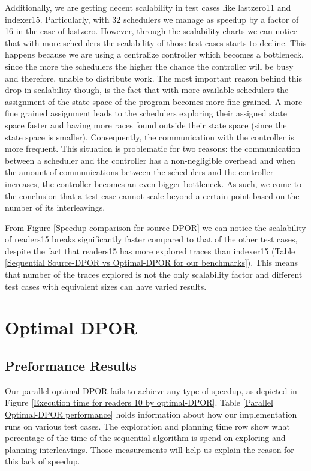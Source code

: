 Additionally, we are getting decent scalability in test cases like lastzero11 and indexer15. Particularly, with
32 schedulers we manage as speedup by a factor of 16 in the case of lastzero. However, through the scalability charts 
we can notice that with more schedulers the scalability of those test cases starts to decline. This happens because we
are using a centralize controller which becomes a bottleneck, since the more the schedulers the
higher the chance the controller will be busy and therefore, unable to distribute work. The most important reason 
behind this drop in scalability though, is the fact that with more available schedulers the assignment of the state
space of the program becomes more fine grained. A more fine grained assignment leads to the schedulers exploring their
assigned state space faster and having more races found outside their state space (since the state space is smaller).
Consequently, the communication with the controller is more frequent. This situation is problematic for two reasons:
the communication between a scheduler and the controller has a non-negligible overhead and when the amount of 
communications between the schedulers and the controller increases, the controller becomes an even bigger bottleneck.
As such, we come to the conclusion that a test case cannot scale beyond a certain point based on the number of its interleavings.

From Figure \ref{Speedup comparison for source-DPOR} we can notice the scalability of readers15 breaks significantly faster
compared to that of the other test cases, despite the fact that readers15 has more explored traces than indexer15
(Table \ref{Sequential Source-DPOR vs Optimal-DPOR for our benchmarks}). This means that number of the traces explored
is not the only scalability factor and different test cases with equivalent sizes can have varied results.

\section{Optimal DPOR}

\subsection{Preformance Results}

Our parallel optimal-DPOR fails to achieve any type of speedup, as depicted in Figure 
\ref{Execution time for readers 10 by optimal-DPOR}. Table \ref{Parallel Optimal-DPOR performance}
holds information about how our implementation runs on various test cases. The exploration and planning
time row show what percentage of the time of the sequential algorithm is spend on exploring and planning interleavings.
Those measurements will help us explain the reason for this lack of speedup.

